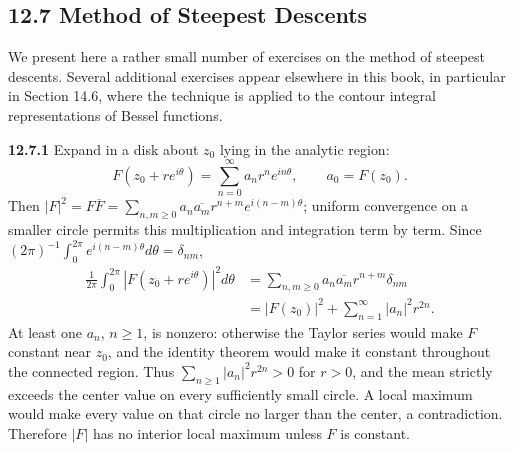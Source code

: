 \subsection*{12.7 Method of Steepest Descents}

We present here a rather small number of exercises on the method of steepest
descents. Several additional exercises appear elsewhere in this book, in
particular in Section 14.6, where the technique is applied to the contour
integral representations of Bessel functions.

\par\bigskip
\noindent\textbf{12.7.1}\quad {}
\solution
{}
Expand in a disk about $z_0$ lying in the analytic region:
\[
F(z_0+re^{i\theta})=\sum_{n=0}^{\infty}a_nr^ne^{in\theta},\qquad
a_0=F(z_0).
\]
Then $|F|^2=F\overline F=\sum_{n,m\ge0}a_n\overline{a_m}r^{n+m}
e^{i(n-m)\theta}$; uniform convergence on a smaller circle permits
this multiplication and integration term by term. Since
$(2\pi)^{-1}\int_0^{2\pi}e^{i(n-m)\theta}d\theta=\delta_{nm}$,
\begin{align*}
\frac1{2\pi}\int_0^{2\pi}|F(z_0+re^{i\theta})|^2d\theta
&=\sum_{n,m\ge0}a_n\overline{a_m}r^{n+m}\delta_{nm}\\
&=\boxed{|F(z_0)|^2+\sum_{n=1}^{\infty}|a_n|^2r^{2n}}.
\end{align*}
At least one $a_n$, $n\ge1$, is nonzero: otherwise the Taylor series
would make $F$ constant near $z_0$, and the identity theorem would make
it constant throughout the connected region. Thus
$\sum_{n\ge1}|a_n|^2r^{2n}>0$ for $r>0$, and the mean strictly exceeds
the center value on every sufficiently small circle. A local maximum
would make every value on that circle no larger than the center, a
contradiction. Therefore
$|F|$ has no interior local maximum unless $F$ is constant.

